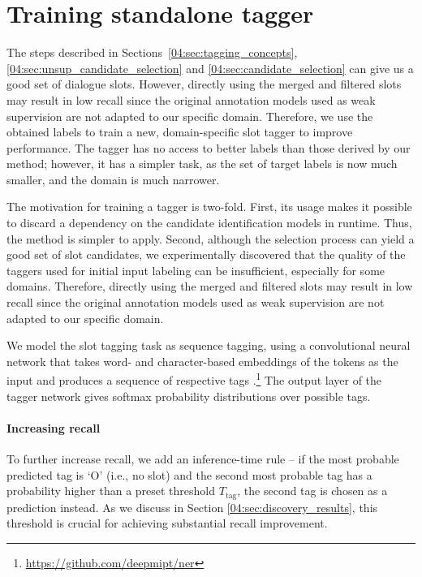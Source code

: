 \section{Training standalone tagger}
\label{04:sec:training_tagger}
The steps described in Sections~\ref{04:sec:tagging_concepts}, \ref{04:sec:unsup_candidate_selection} and \ref{04:sec:candidate_selection} can give us a good set of dialogue slots. %
However, directly using the merged and filtered slots may result in low recall since the original annotation models used as weak supervision are not adapted to our specific domain.
Therefore, we use the obtained labels to train a new, domain-specific slot tagger to improve performance.
The tagger has no access to better labels than those derived by our method; however, it has a simpler task, as the set of target labels is now much smaller, and the domain is much narrower.

The motivation for training a tagger is two-fold.
First, its usage makes it possible to discard a dependency on the candidate identification models in runtime.
Thus, the method is simpler to apply. 
Second, although the selection process can yield a good set of slot candidates, we experimentally discovered that the quality of the taggers used for initial input labeling can be insufficient, especially for some domains.
Therefore, directly using the merged and filtered slots may result in low recall since the original annotation models used as weak supervision are not adapted to our specific domain.

We model the slot tagging task as sequence tagging, using a convolutional neural network that takes word- and character-based embeddings of the tokens as the input and produces a sequence of respective tags \cite{lample2016neural}.\footnote{\url{https://github.com/deepmipt/ner}}
The output layer of the tagger network gives softmax probability distributions over possible tags.

\paragraph{Increasing recall} To further increase recall, we add an inference-time rule -- if the most probable predicted tag is `O' (i.e., no slot) and the second most probable tag has a probability higher than a preset threshold $T_{\text{tag}}$, the second tag is chosen as a prediction instead.
As we discuss in Section \ref{04:sec:discovery_results}, this threshold is crucial for achieving substantial recall improvement.


